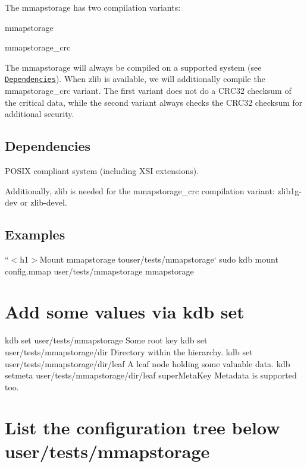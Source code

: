 The mmapstorage has two compilation variants\+:


\begin{DoxyEnumerate}
\item mmapstorage
\item mmapstorage\+\_\+crc
\end{DoxyEnumerate}

The {\ttfamily mmapstorage} will always be compiled on a supported system (see \href{#dependencies}{\tt Dependencies}). When zlib is available, we will additionally compile the {\ttfamily mmapstorage\+\_\+crc} variant. The first variant does not do a C\+R\+C32 checksum of the critical data, while the second variant always checks the C\+R\+C32 checksum for additional security.

\subsection*{Dependencies}

P\+O\+S\+IX compliant system (including X\+SI extensions).

Additionally, zlib is needed for the {\ttfamily mmapstorage\+\_\+crc} compilation variant\+: {\ttfamily zlib1g-\/dev} or {\ttfamily zlib-\/devel}.

\subsection*{Examples}

``{\ttfamily  $<$h1$>$Mount mmapstorage to}user/tests/mmapstorage` sudo kdb mount config.\+mmap user/tests/mmapstorage mmapstorage

\section*{Add some values via {\ttfamily kdb set}}

kdb set user/tests/mmapstorage \textquotesingle{}Some root key\textquotesingle{} kdb set user/tests/mmapstorage/dir \textquotesingle{}Directory within the hierarchy.\textquotesingle{} kdb set user/tests/mmapstorage/dir/leaf \textquotesingle{}A leaf node holding some valuable data.\textquotesingle{} kdb setmeta user/tests/mmapstorage/dir/leaf super\+Meta\+Key \textquotesingle{}Metadata is supported too.\textquotesingle{}

\section*{List the configuration tree below {\ttfamily user/tests/mmapstorage}}

